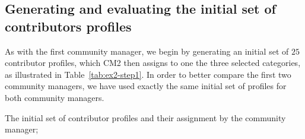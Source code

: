 \subsection{Generating and evaluating the initial set of contributors profiles}

As with the first community manager, we begin by generating an initial set of $25$ contributor profiles, which \textsc{CM2} then assigns to one the three selected categories, as illustrated in Table~\ref{tab:ex2-step1}. In order to better compare the first two community managers, we have used exactly the same initial set of profiles for both community managers.

\begin{table}
\caption{The initial set of contributor profiles and their assignment by the community manager;}\label{tab:ex2-step1}
\small


\end{table}
